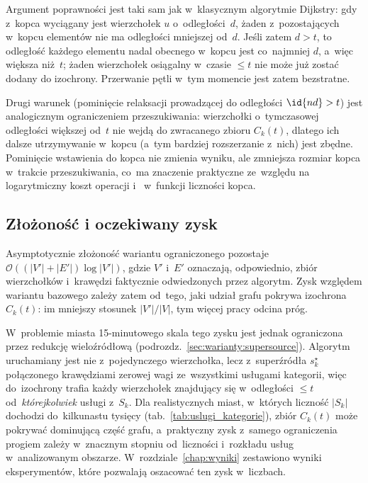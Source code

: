 Argument poprawności jest taki sam jak w~klasycznym algorytmie Dijkstry: gdy z~kopca
wyciągany jest wierzchołek $u$ o~odległości~$d$, żaden z~pozostających
w~kopcu elementów nie ma odległości mniejszej od~$d$.
Jeśli zatem $d>t$, to odległość każdego elementu nadal obecnego w~kopcu jest
co~najmniej $d$, a~więc większa niż~$t$; żaden wierzchołek osiągalny
w~czasie $\le t$ nie może już zostać dodany do izochrony. Przerwanie pętli
w~tym momencie jest zatem bezstratne.

Drugi warunek (pominięcie relaksacji prowadzącej do odległości $\id{nd}>t$)
jest analogicznym ograniczeniem przeszukiwania: wierzchołki o~tymczasowej odległości większej
od~$t$ nie wejdą do zwracanego zbioru $C_k(t)$, dlatego ich dalsze utrzymywanie
w~kopcu (a~tym bardziej rozszerzanie z~nich) jest zbędne. Pominięcie wstawienia
do kopca nie zmienia wyniku, ale zmniejsza rozmiar kopca w~trakcie
przeszukiwania, co~ma znaczenie praktyczne ze~względu na logarytmiczny
koszt operacji  i~ w~funkcji liczności
kopca.

\clearpage

\subsection{Złożoność i oczekiwany zysk}
\label{subsec:warianty:modified:zlozonosc}

Asymptotycznie złożoność wariantu ograniczonego pozostaje
$\mathcal{O}((|V'|+|E'|)\log|V'|)$, gdzie $V'$ i~$E'$ oznaczają, odpowiednio,
zbiór wierzchołków i~krawędzi faktycznie odwiedzonych przez algorytm.
Zysk względem wariantu bazowego zależy zatem od~tego, jaki udział grafu
pokrywa izochrona $C_k(t)$: im mniejszy stosunek $|V'|/|V|$, tym więcej
pracy odcina próg.

W~problemie miasta 15-minutowego skala tego zysku jest jednak ograniczona
przez redukcję wieloźródłową (podrozdz.~\ref{sec:warianty:supersource}).
Algorytm uruchamiany jest nie z~pojedynczego wierzchołka, lecz z~superźródła
$s^\star_k$ połączonego krawędziami zerowej wagi ze~wszystkimi usługami
kategorii, więc do~izochrony trafia każdy wierzchołek znajdujący się
w~odległości $\le t$ od~\emph{którejkolwiek} usługi z~$S_k$. Dla realistycznych
miast, w~których liczność $|S_k|$ dochodzi do~kilkunastu tysięcy
(tab.~\ref{tab:uslugi_kategorie}), zbiór $C_k(t)$ może pokrywać dominującą
część grafu, a~praktyczny zysk z~samego ograniczenia progiem zależy w~znacznym
stopniu od~liczności i~rozkładu usług w~analizowanym obszarze. W~rozdziale~\ref{chap:wyniki}
zestawiono wyniki eksperymentów, które pozwalają oszacować ten zysk w~liczbach.

